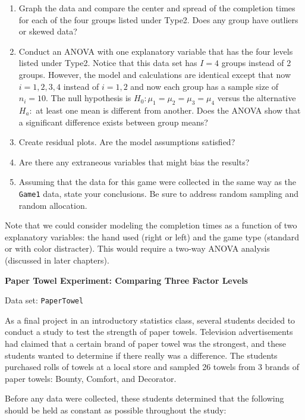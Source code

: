 \documentclass[
]{report}
\begin{document}
\begin{list}{E..}{ \setlength{\itemsep}{1.2em}}
    \begin{enumerate}
      \item Graph the data and compare the center and spread of the completion times for each of the four groups listed under Type2. Does any group have outliers or skewed data?
      \item Conduct an ANOVA with one explanatory variable that has the four levels listed under Type2. Notice that this data set has $I = 4$ groups instead of 2 groups. However, the model and calculations are identical except that now $i = 1, 2, 3, 4$ instead of $i = 1, 2$ and now each group has a sample size of $n_i = 10$. The null hypothesis is $H_0\colon \mu_1 = \mu_2 = \mu_3 = \mu_4$ versus the alternative $H_a\colon$ at least one mean is different from another. Does the ANOVA show that a significant difference exists between group means?
      \item Create residual plots. Are the model assumptions satisfied?
      \item Are there any extraneous variables that might bias the results?
      \item Assuming that the data for this game were collected in the same way as the \texttt{Game1} data, state your conclusions. Be sure to address random sampling and random allocation.
    \end{enumerate}
    
Note that we could consider modeling the completion times as a function of two explanatory variables: the hand used (right or left) and the game type (standard or with color distracter). This would require a two-way ANOVA analysis (discussed in later chapters).

  \item \textbf{Paper Towel Experiment: Comparing Three Factor Levels}

Data set: \texttt{PaperTowel}

As a final project in an introductory statistics class, several students decided to conduct a study to test the strength of paper towels. Television advertisements had claimed that a certain brand of paper towel was the strongest, and these students wanted to determine if there really was a difference. The students purchased rolls of towels at a local store and sampled 26 towels from 3 brands of paper towels: Bounty, Comfort, and Decorator.

Before any data were collected, these students determined that the following should be held as constant as possible throughout the study:


\end{list}
\end{document}
